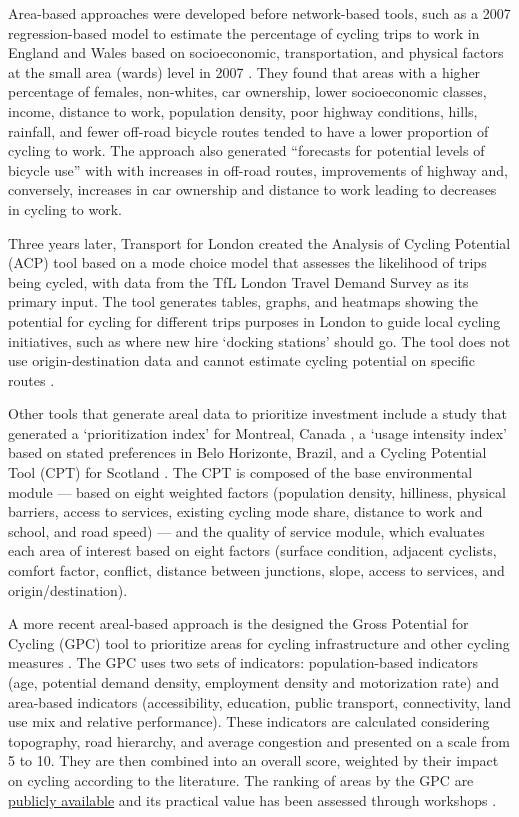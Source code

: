 \documentclass[
  super,
  preprint,
  3p]{elsarticle}
\begin{document}
Area-based approaches were developed before network-based tools, such as
a 2007 regression-based model to estimate the percentage of cycling
trips to work in England and Wales based on socioeconomic,
transportation, and physical factors at the small area (wards) level in
2007 \citep{parkin_estimation_2007}. They found that areas with a higher
percentage of females, non-whites, car ownership, lower socioeconomic
classes, income, distance to work, population density, poor highway
conditions, hills, rainfall, and fewer off-road bicycle routes tended to
have a lower proportion of cycling to work. The approach also generated
``forecasts for potential levels of bicycle use'' with with increases in
off-road routes, improvements of highway and, conversely, increases in
car ownership and distance to work leading to decreases in cycling to
work.

Three years later, Transport for London created the Analysis of Cycling
Potential (ACP) tool based on a mode choice model that assesses the
likelihood of trips being cycled, with data from the TfL London Travel
Demand Survey as its primary input. The tool generates tables, graphs,
and heatmaps showing the potential for cycling for different trips
purposes in London to guide local cycling initiatives, such as where new
hire `docking stations' should go. The tool does not use
origin-destination data and cannot estimate cycling potential on
specific routes \citep{transport_for_london_analysis_2010}.

Other tools that generate areal data to prioritize investment include a
study that generated a `prioritization index' for Montreal, Canada
\citep{larsen_build_2013}, a `usage intensity index' based on stated
preferences in Belo Horizonte, Brazil, and a Cycling Potential Tool
(CPT) for Scotland \citep{phillips_development_2017}. The CPT is
composed of the base environmental module --- based on eight weighted
factors (population density, hilliness, physical barriers, access to
services, existing cycling mode share, distance to work and school, and
road speed) --- and the quality of service module, which evaluates each
area of interest based on eight factors (surface condition, adjacent
cyclists, comfort factor, conflict, distance between junctions, slope,
access to services, and origin/destination).

A more recent areal-based approach is the designed the Gross Potential
for Cycling (GPC) tool to prioritize areas for cycling infrastructure
and other cycling measures \citep{silva_gross_2021}. The GPC uses two
sets of indicators: population-based indicators (age, potential demand
density, employment density and motorization rate) and area-based
indicators (accessibility, education, public transport, connectivity,
land use mix and relative performance). These indicators are calculated
considering topography, road hierarchy, and average congestion and
presented on a scale from 5 to 10. They are then combined into an
overall score, weighted by their impact on cycling according to the
literature. The ranking of areas by the GPC are
\href{https://boost.up.pt/en/ferramentas/gpc}{publicly available} and
its practical value has been assessed through workshops
\citep{silva_revealing_2022}.
\end{document}
